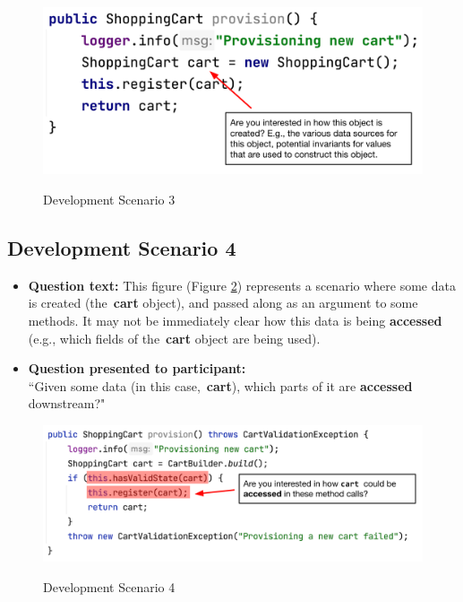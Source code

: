 \begin{figure}[ht]
\centering
\caption{Development Scenario 3}
\includegraphics[width=\textwidth]{./figs/ds3.png}
\label{fig:DS3}
\end{figure}

\subsection{Development Scenario 4}

\begin{itemize}
  \item[] \textbf{Question text:} This figure (Figure \ref{fig:DS4}) represents 
          a scenario where some data is created (the \textbf{cart} object), and
          passed along as an argument to some methods. It may not be 
          immediately clear how this data is being \textbf{accessed} (e.g., 
          which fields of the \textbf{cart} object are being used).
  \item[] \textbf{Question presented to participant:}  \\
          ``Given some data (in this case, \textbf{cart}), which parts of it
          are \textbf{accessed} downstream?"
\end{itemize}

\begin{figure}[ht]
\centering
\caption{Development Scenario 4}
\includegraphics[width=\textwidth]{./figs/ds4.png}
\label{fig:DS4}
\end{figure}

